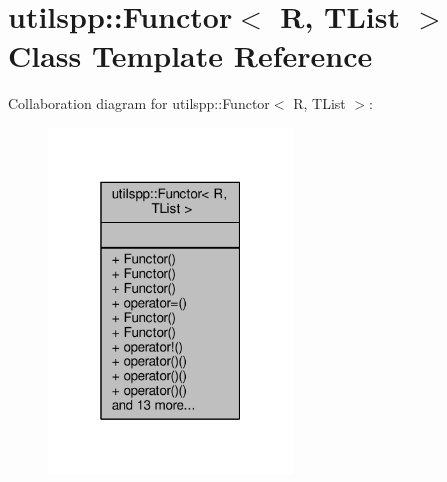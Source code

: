 \hypertarget{classutilspp_1_1Functor}{\section{utilspp\-:\-:Functor$<$ R, T\-List $>$ Class Template Reference}
\label{classutilspp_1_1Functor}
}


Collaboration diagram for utilspp\-:\-:Functor$<$ R, T\-List $>$\-:\nopagebreak
\begin{figure}[H]
\begin{center}
\leavevmode
\includegraphics[width=184pt]{classutilspp_1_1Functor__coll__graph}
\end{center}
\end{figure}
